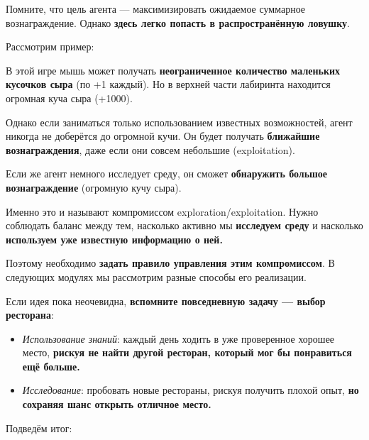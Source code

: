 \documentclass[11pt,a4paper]{article}
\begin{document}
Помните, что цель агента --- максимизировать ожидаемое суммарное вознаграждение. Однако \textbf{здесь легко попасть в распространённую ловушку}.

Рассмотрим пример:


В этой игре мышь может получать \textbf{неограниченное количество маленьких кусочков сыра} (по +1 каждый). Но в верхней части лабиринта находится огромная куча сыра (+1000).

Однако если заниматься только использованием известных возможностей, агент никогда не доберётся до огромной кучи. Он будет получать \textbf{ближайшие вознаграждения}, даже если они совсем небольшие (exploitation).

Если же агент немного исследует среду, он сможет \textbf{обнаружить большое вознаграждение} (огромную кучу сыра).

Именно это и называют компромиссом exploration/exploitation. Нужно соблюдать баланс между тем, насколько активно мы \textbf{исследуем среду} и насколько \textbf{используем уже известную информацию о ней.}

Поэтому необходимо \textbf{задать правило управления этим компромиссом}. В следующих модулях мы рассмотрим разные способы его реализации.

Если идея пока неочевидна, \textbf{вспомните повседневную задачу --- выбор ресторана}:



\begin{itemize}
\tightlist
\item
  \emph{Использование знаний}: каждый день ходить в уже проверенное хорошее место, \textbf{рискуя не найти другой ресторан, который мог бы понравиться ещё больше.}
\item
  \emph{Исследование}: пробовать новые рестораны, рискуя получить плохой опыт, \textbf{но сохраняя шанс открыть отличное место.}
\end{itemize}

Подведём итог:

\end{document}
